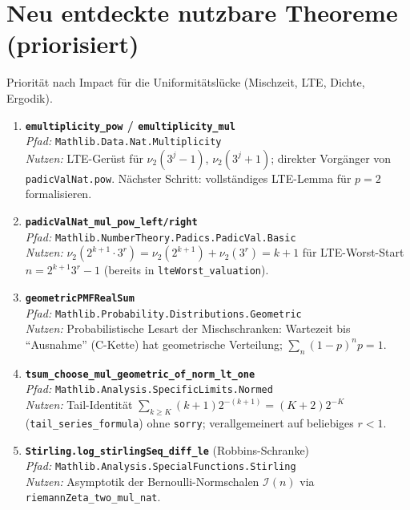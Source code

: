 \documentclass[12pt,a4paper]{article}
\newcommand{\Mathlib}[1]{\texttt{Mathlib.\allowbreak #1}}
\newcommand{\vii}{\nu_2}
\begin{document}
\section{Neu entdeckte nutzbare Theoreme (priorisiert)}
\label{sec:neu}

Priorität nach Impact für die Uniformitätslücke (Mischzeit, LTE, Dichte, Ergodik).

\begin{enumerate}[label=\textbf{\arabic*.}]

\item \textbf{\texttt{emultiplicity\_pow} / \texttt{emultiplicity\_mul}}\\
\textit{Pfad:} \Mathlib{Data.Nat.Multiplicity}\\
\textit{Nutzen:} LTE-Gerüst für $\vii(3^j-1)$, $\vii(3^j+1)$; direkter Vorgänger von
\texttt{padicValNat.pow}. Nächster Schritt: vollständiges LTE-Lemma für $p=2$ formalisieren.

\item \textbf{\texttt{padicValNat\_mul\_pow\_left/right}}\\
\textit{Pfad:} \Mathlib{NumberTheory.Padics.PadicVal.Basic}\\
\textit{Nutzen:} $\vii(2^{k+1}\cdot 3^r)=\vii(2^{k+1})+\vii(3^r)=k{+}1$ für LTE-Worst-Start
$n=2^{k+1}3^r-1$ (bereits in \texttt{lteWorst\_valuation}).

\item \textbf{\texttt{geometricPMFRealSum}}\\
\textit{Pfad:} \Mathlib{Probability.Distributions.Geometric}\\
\textit{Nutzen:} Probabilistische Lesart der Mischschranken: Wartezeit bis
``Ausnahme'' (C-Kette) hat geometrische Verteilung; $\sum_n (1-p)^n p = 1$.

\item \textbf{\texttt{tsum\_choose\_mul\_geometric\_of\_norm\_lt\_one}}\\
\textit{Pfad:} \Mathlib{Analysis.SpecificLimits.Normed}\\
\textit{Nutzen:} Tail-Identität $\sum_{k\geq K}(k{+}1)2^{-(k+1)}=(K{+}2)2^{-K}$
(\texttt{tail\_series\_formula}) ohne \texttt{sorry}; verallgemeinert auf beliebiges $r<1$.

\item \textbf{\texttt{Stirling.log\_stirlingSeq\_diff\_le}} (Robbins-Schranke)\\
\textit{Pfad:} \Mathlib{Analysis.SpecialFunctions.Stirling}\\
\textit{Nutzen:} Asymptotik der Bernoulli-Normschalen $\mathcal{I}(n)$ via
\texttt{riemannZeta\_two\_mul\_nat}.


\end{enumerate}
\end{document}
